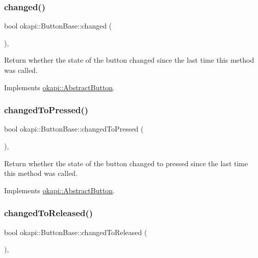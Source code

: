 \subsubsection{\texorpdfstring{changed()}{changed()}}
{\footnotesize\ttfamily bool okapi\+::\+Button\+Base\+::changed (\begin{DoxyParamCaption}{ }\end{DoxyParamCaption})\hspace{0.3cm}{\ttfamily [override]}, {\ttfamily [virtual]}}

Return whether the state of the button changed since the last time this method was called. 

Implements \mbox{\hyperlink{classokapi_1_1AbstractButton_a72dd56f1e084b3313a2a407aa35dc7dc}{okapi\+::\+Abstract\+Button}}.

\mbox{\label{classokapi_1_1ButtonBase_ac97e3d96db3d83f1638ad071e2dff856}} 
\subsubsection{\texorpdfstring{changedToPressed()}{changedToPressed()}}
{\footnotesize\ttfamily bool okapi\+::\+Button\+Base\+::changed\+To\+Pressed (\begin{DoxyParamCaption}{ }\end{DoxyParamCaption})\hspace{0.3cm}{\ttfamily [override]}, {\ttfamily [virtual]}}

Return whether the state of the button changed to pressed since the last time this method was called. 

Implements \mbox{\hyperlink{classokapi_1_1AbstractButton_a762fbcfb5065497d743a6a43fd2032f3}{okapi\+::\+Abstract\+Button}}.

\mbox{\label{classokapi_1_1ButtonBase_a7916b659f61e8ef2b23aec879a65fbac}} 
\subsubsection{\texorpdfstring{changedToReleased()}{changedToReleased()}}
{\footnotesize\ttfamily bool okapi\+::\+Button\+Base\+::changed\+To\+Released (\begin{DoxyParamCaption}{ }\end{DoxyParamCaption})\hspace{0.3cm}{\ttfamily [override]}, {\ttfamily [virtual]}}

